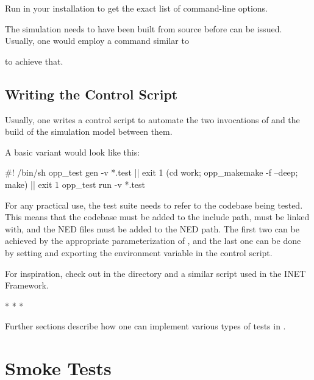 \begin{note}
Run  in your {\opp} installation to get the exact list of
command-line options.
\end{note}

The simulation needs to have been built from source before  can be issued. Usually, one would employ a command similar to


to achieve that.

\subsection{Writing the Control Script}
\label{sec:testing:opptest:writing-control-script}

Usually, one writes a control script to automate the two invocations of 
and the build of the simulation model between them.

A basic variant would look like this:

\begin{filelisting}
#! /bin/sh
opp_test gen -v *.test || exit 1
(cd work; opp_makemake -f --deep; make) || exit 1
opp_test run -v *.test
\end{filelisting}

For any practical use, the test suite needs to refer to the codebase being
tested. This means that the codebase must be added to the include path,
must be linked with, and the NED files must be added to the NED path. The
first two can be achieved by the appropriate parameterization of
, and the last one can be done by setting and exporting
the  environment variable in the control script.

For inspiration, check out  in the 
directory and a similar script used in the INET Framework.

\bigskip
\begin{center}
* * *
\end{center}
\bigskip

Further sections describe how one can implement various types of tests in
{\opp}.

\section{Smoke Tests}
\label{sec:testing:smoke-tests}

